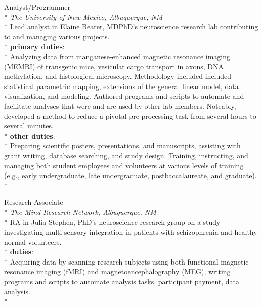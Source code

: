 \documentclass[]{friggeri-cv} %
\begin{document}
\begin{description}
  \item {\largeheaderfont Analyst/Programmer} \hfill 
    { }\\*
    {\footnotesize \emph{The University of New Mexico, Albuquerque, NM }} \\*
    Lead analyst in Elaine Bearer, MD\textemdash PhD's neuroscience research lab 
    contributing to and managing various projects. \\*
    \textbf{primary duties}: \\*
    Analyzing data from manganese-enhanced magnetic resonance
    imaging (MEMRI) of transgenic mice, vesicular cargo transport
    in axons, DNA methylation, and histological microscopy. Methodology
    included included statistical parametric mapping, extensions of the general linear
    model, data visualization, and modeling. Authored programs and scripts to
    automate and facilitate analyses that were and are used by other lab
    members. Noteably, developed a method to reduce a pivotal pre-processing task from
    several hours to several minutes.\\*
    \textbf{other duties}: \\*
    Preparing scientific posters, presentations, and manuscripts, 
    assisting with grant writing, database searching, and study design. 
    Training, instructing, and managing both student employees and volunteers at various levels of training 
    (e.g., early undergraduate, late undergraduate, postbaccalaureate, and
    graduate). \\* 
  \item  {\largeheaderfont Research Associate} \hfill {} \\*
    {\footnotesize \emph{The Mind Research Network, Albuquerque, NM}}  \\*
    RA in Julia Stephen, PhD's neuroscience research group on a study investigating multi-sensory integration in
    patients with schizophrenia and healthy normal volunteers. \\*
    \textbf{duties}:\\*
    Acquiring data by scanning research subjects using both functional
    magnetic resonance imaging (fMRI) and magnetoencephalography (MEG), writing
    programs and scripts to automate analysis tasks, 
    participant payment, data analysis.  \\*
\end{description}
\end{document}

